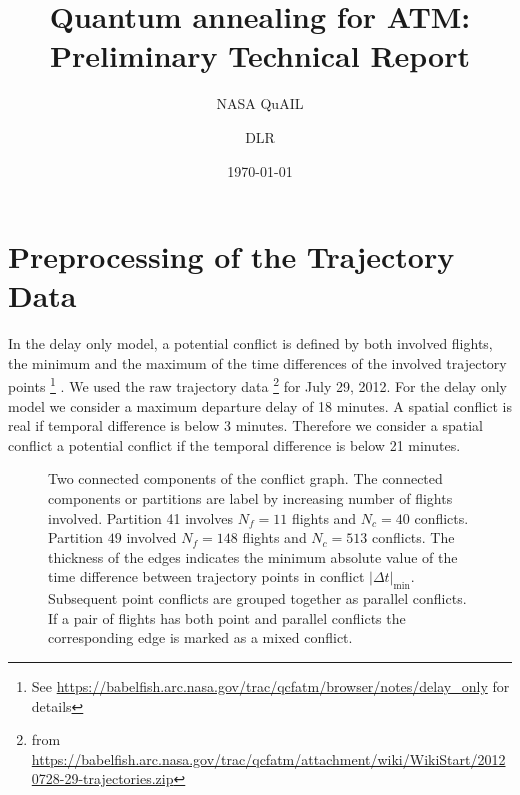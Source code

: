\documentclass{article}
\date{\today}
\author{NASA QuAIL \and DLR}
\title{Quantum annealing for ATM: Preliminary Technical Report}
\begin{document}
\maketitle

\section{Preprocessing of the Trajectory Data}
In the delay only model, a potential conflict is defined by both involved flights, the minimum and the maximum of the time differences of the involved trajectory points 
\footnote{See \url{https://babelfish.arc.nasa.gov/trac/qcfatm/browser/notes/delay_only} for details}
.
We used the raw trajectory data
\footnote{from \url{https://babelfish.arc.nasa.gov/trac/qcfatm/attachment/wiki/WikiStart/20120728-29-trajectories.zip}}
for July 29, 2012.
For the delay only model we consider a maximum departure delay of 18 minutes. 
A spatial conflict is real if temporal difference is below 3 minutes.
Therefore we consider a spatial conflict a potential conflict if the temporal difference is below 21 minutes.

\begin{figure}[htpb]
    \centering
    \scalebox{0.4}{}
    \scalebox{0.4}{}
    \caption{Two connected components of the conflict graph. The connected components or partitions are label by increasing number of flights involved. Partition 41 involves $N_f=11$ flights and $N_c=40$ conflicts. Partition $49$ involved $N_f=148$ flights and $N_c=513$ conflicts. The thickness of the edges indicates the minimum absolute value of the time difference between trajectory points in conflict $|\Delta t|_\text{min}$. Subsequent point conflicts are grouped together as parallel conflicts. If a pair of flights has both point and parallel conflicts the corresponding edge is marked as a mixed conflict.}
    \label{fig:pre_connected_components}
\end{figure}
\end{document}
